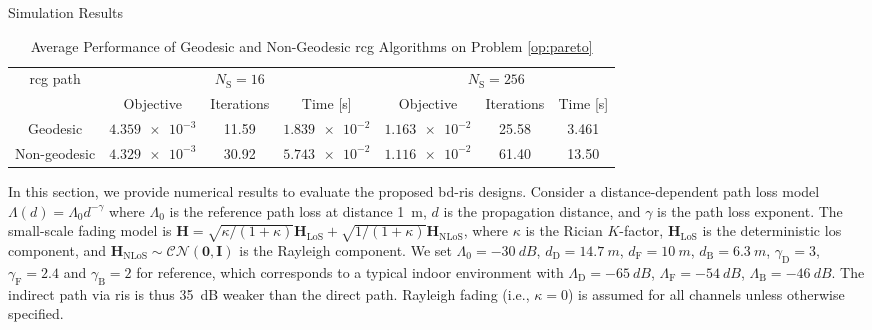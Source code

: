 \documentclass[journal]{IEEEtran}
\begin{document}
\begin{section}{Simulation Results}\label{sc:simulation}
	\begin{table}[!t]
		\caption{Average Performance of Geodesic and Non-Geodesic \gls{rcg} Algorithms on Problem \eqref{op:pareto}}
		\label{tb:complexity_test}
		\centering
		\begin{tabular}{ccccccc}
			\toprule
			\multirow{2}{*}{\gls{rcg} path} & \multicolumn{3}{c}{$N_\mathrm{S}=16$} & \multicolumn{3}{c}{$N_\mathrm{S}=256$}                                                               \\ \cmidrule(lr){2-4} \cmidrule(lr){5-7}
											& Objective                             & Iterations                             & Time [s]         & Objective        & Iterations & Time [s] \\ \midrule
			Geodesic                        & $\num{4.359e-3}$                      & 11.59                                  & $\num{1.839e-2}$ & $\num{1.163e-2}$ & 25.58      & 3.461    \\
			Non-geodesic                    & $\num{4.329e-3}$                      & 30.92                                  & $\num{5.743e-2}$ & $\num{1.116e-2}$ & 61.40      & 13.50    \\ \bottomrule
		\end{tabular}
	\end{table}
	In this section, we provide numerical results to evaluate the proposed \gls{bd}-\gls{ris} designs.
	Consider a distance-dependent path loss model $\Lambda(d) = \Lambda_0 d^{-\gamma}$ where $\Lambda_0$ is the reference path loss at distance \qty{1}{m}, $d$ is the propagation distance, and $\gamma$ is the path loss exponent.
	The small-scale fading model is $\mathbf{H} = \sqrt{\kappa/(1+\kappa)} \mathbf{H}_\text{LoS} + \sqrt{1/(1+\kappa)} \mathbf{H}_\text{NLoS}$, where $\kappa$ is the Rician $K$-factor, $\mathbf{H}_\text{LoS}$ is the deterministic \gls{los} component, and $\mathbf{H}_\text{NLoS} \sim \mathcal{CN}(\mathbf{0}, \mathbf{I})$ is the Rayleigh component.
	We set $\Lambda_0=\qty{-30}{dB}$, $d_\mathrm{D}=\qty{14.7}{m}$, $d_\mathrm{F}=\qty{10}{m}$, $d_\mathrm{B}=\qty{6.3}{m}$, $\gamma_\mathrm{D}=3$, $\gamma_\mathrm{F}=2.4$ and $\gamma_\mathrm{B}=2$ for reference, which corresponds to a typical indoor environment with $\Lambda_\mathrm{D}=\qty{-65}{dB}$, $\Lambda_\mathrm{F}=\qty{-54}{dB}$, $\Lambda_\mathrm{B}=\qty{-46}{dB}$.
	The indirect path via \gls{ris} is thus \qty{35}{\dB} weaker than the direct path.
	Rayleigh fading (i.e., $\kappa = 0$) is assumed for all channels unless otherwise specified.


\end{section}
\end{document}
